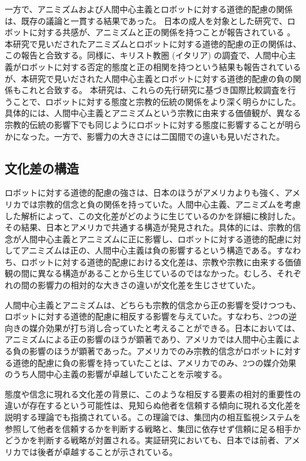 \documentclass[a4j,12pt]{jreport}
\begin{document}
一方で、アニミズムおよび人間中心主義とロボットに対する道徳的配慮の関係は、既存の議論と一貫する結果であった。
日本の成人を対象とした研究で、ロボットに対する共感が、アニミズムと正の関係を持つことが報告されている\cite{okanda} 。本研究で見いだされたアニミズムとロボットに対する道徳的配慮の正の関係は、この報告と合致する。同様に、キリスト教圏 (イタリア) の調査で、人間中心主義がロボットに対する否定的態度と正の相関を持つという結果も報告されている\cite{fortu}が、本研究で見いだされた人間中心主義とロボットに対する道徳的配慮の負の関係もこれと合致する。
本研究は、これらの先行研究に基づき国際比較調査を行うことで、ロボットに対する態度と宗教的伝統の関係をより深く明らかにした。具体的には、人間中心主義とアニミズムという宗教に由来する価値観が、異なる宗教的伝統の影響下でも同じようにロボットに対する態度に影響することが明らかになった。一方で、影響力の大きさには二国間での違いも見いだされた。


\subsection{文化差の構造}
ロボットに対する道徳的配慮の強さは、日本のほうがアメリカよりも強く、アメリカでは宗教的信念と負の関係を持っていた。人間中心主義、アニミズムを考慮した解析によって、この文化差がどのように生じているのかを詳細に検討した。その結果、日本とアメリカで共通する構造が発見された。具体的には、宗教的信念が人間中心主義とアニミズムに正に影響し、ロボットに対する道徳的配慮に対してアニミズムは正の、人間中心主義は負の影響するという構造である。すなわち、ロボットに対する道徳的配慮における文化差は、宗教や宗教に由来する価値観の間に異なる構造があることから生じているのではなかった。むしろ、それぞれの間の影響力の相対的な大きさの違いが文化差を生じさせていた。


人間中心主義とアニミズムは、どちらも宗教的信念から正の影響を受けつつも、ロボットに対する道徳的配慮に相反する影響を与えていた。すなわち、2つの逆向きの媒介効果が打ち消し合っていたと考えることができる。日本においては、アニミズムによる正の影響のほうが顕著であり、アメリカでは人間中心主義による負の影響のほうが顕著であった。アメリカでのみ宗教的信念がロボットに対する道徳的配慮に負の影響を持っていたことは、アメリカでのみ、2つの媒介効果のうち人間中心主義の影響が卓越していたことを示唆する。


態度や信念に現れる文化差の背景に、このような相反する要素の相対的重要性の違いが存在するという可能性は、見知らぬ他者を信頼する傾向に現れる文化差を説明する理論\cite{yamagishi}でも指摘されている。この理論では、集団内の相互監視システムを参照して他者を信頼するかを判断する戦略と、集団に依存せず信頼に足る相手かどうかを判断する戦略が対置される。実証研究においても、日本では前者、アメリカでは後者が卓越することが示されている。
\end{document}

